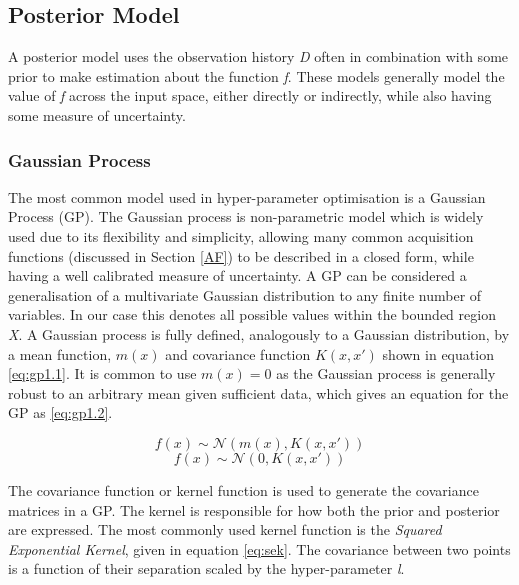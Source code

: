 \documentclass{article}
\begin{document}
	\subsection{Posterior Model}

		A posterior model uses the observation history \textit{D} often in combination with some prior to make estimation about the function \textit{f}. These models generally model the value of \textit{f} across the input space, either directly or indirectly, while also having some measure of uncertainty.




		\subsubsection{Gaussian Process}

			The most common model used in hyper-parameter optimisation is a Gaussian Process (GP)\cite{17}. The Gaussian process is non-parametric model which is widely used due to its flexibility and simplicity, allowing many common acquisition functions (discussed in Section \ref{AF}) to be described in a closed form, while having a well calibrated measure of uncertainty. A GP can be considered a generalisation of a multivariate Gaussian distribution to any finite number of variables. In our case this denotes all possible values within the bounded region \textit{X}. A Gaussian process is fully defined, analogously to a Gaussian distribution, by a mean function, \(m(x)\) and covariance function \(K(x,x')\) shown in equation \ref{eq:gp1.1}. It is common to use \(m(x) = 0\) as the Gaussian process is generally robust to an arbitrary mean given sufficient data, which gives an equation for the GP as \ref{eq:gp1.2}.

			\begin{equation}\label{eq:gp1.1}f(x) \sim  \mathcal{N}(m(x) , K(x,x'))\end{equation}
			\begin{equation}\label{eq:gp1.2}f(x) \sim  \mathcal{N}(0 , K(x,x'))\end{equation}

			The covariance function or kernel function is used to generate the covariance matrices in a GP. The kernel is responsible for how both the prior and posterior are expressed. The most commonly used kernel function is the \textit{Squared Exponential Kernel}, given in equation \ref{eq:sek}. The covariance between two points is a function of their separation scaled by the hyper-parameter \textit{l}. 
\end{document}
